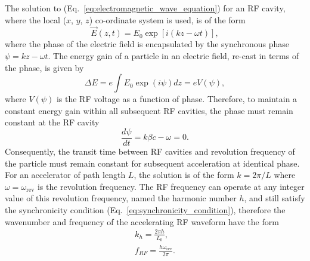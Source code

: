 \documentclass[../main.tex]{subfiles}
\begin{document}
The solution to (Eq.~\ref{eq:electromagnetic_wave_equation}) for an RF cavity, where the local ($x$, $y$, $z$) co-ordinate system is used, is of the form
\begin{equation}
\overrightarrow{E}\left(z,t\right) = E_{0}\exp\left[i\left(kz-\omega t\right)\right],
\label{eq:RF_cavity_electric_field}    
\end{equation}
where the phase of the electric field is encapsulated by the synchronous phase $\psi = kz-\omega t$. The energy gain of a particle in an electric field, re-cast in terms of the phase, is given by 
\begin{equation}
\Delta E = e \int E_{0}\exp\left(i\psi\right)dz = eV\left(\psi\right),
\label{eq:particle_energy_gain_RF}    
\end{equation}
where $V\left(\psi\right)$ is the RF voltage as a function of phase. Therefore, to maintain a constant energy gain within all subsequent RF cavities, the phase must remain constant at the RF cavity
\begin{equation}
\frac{d\psi}{dt} = k\beta c-\omega = 0. 
\label{eq:synchronicity_condition}   
\end{equation}
Consequently, the transit time between RF cavities and revolution frequency of the particle must remain constant for subsequent acceleration at identical phase. For an accelerator of path length $L$, the solution is of the form $k=2\pi/L$ where $\omega=\omega_{\mathrm{rev}}$ is the revolution frequency. The RF frequency can operate at any integer value of this revolution frequency, named the harmonic number $h$, and still satisfy the synchronicity condition (Eq.~\ref{eq:synchronicity_condition}), therefore the wavenumber and frequency of the accelerating RF waveform have the form
\begin{align}
k_{h} = \frac{2\pi h}{L_{0}},
\label{eq:RF_wavenumber} \\
f_{RF} = \frac{h\omega_{\mathrm{rev}}}{2\pi}.
\label{eq:RF_frequency}
\end{align}
\end{document}
